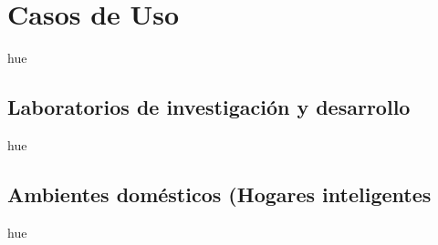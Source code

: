 

\chapter{Casos de Uso}
hue
\section{Laboratorios de investigación y desarrollo}
hue
\section{Ambientes domésticos (Hogares inteligentes}
hue
